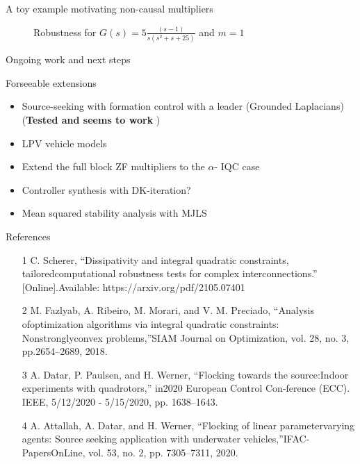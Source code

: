 \documentclass{beamer}
\begin{document}
\begin{frame}{A toy example motivating non-causal multipliers}
	
	\begin{figure}[t]
		
		\caption{Robustness for $G(s)=5\frac{(s-1)}{s(s^2+s+25)}$ and $m=1$}
		\centering
		\label{fig:benefit_of_non_causal_multipliers}
	\end{figure}	
\end{frame}
\begin{frame}{Ongoing work and next steps }
	\begin{block}{Forseeable extensions}
	\begin{itemize}
		\item Source-seeking with formation control with a leader (Grounded Laplacians) (\textbf{Tested and seems to work} )
		\item LPV vehicle models
		\item Extend the full block ZF multipliers to the $\alpha$- IQC case
		\item Controller synthesis with DK-iteration?
		\item Mean squared stability analysis with MJLS
	\end{itemize}
\end{block}
\end{frame}
\begin{frame}{References}
	\begin{itemize}
		\item[1] C.  Scherer,  “Dissipativity  and  integral  quadratic  constraints,  tailoredcomputational robustness tests for complex interconnections.” [Online].Available: https://arxiv.org/pdf/2105.07401
		\item[2]  M.  Fazlyab,  A.  Ribeiro,  M. Morari,  and  V.  M.  Preciado,  “Analysis  ofoptimization algorithms via integral quadratic constraints: Nonstronglyconvex  problems,”SIAM  Journal  on  Optimization,  vol.  28,  no.  3,  pp.2654–2689, 2018.
		\item[3]  A.  Datar,  P.  Paulsen,  and  H.  Werner,  “Flocking  towards  the  source:Indoor experiments with quadrotors,” in2020 European Control Con-ference (ECC).    IEEE, 5/12/2020 - 5/15/2020, pp. 1638–1643.
		\item[4]  A.  Attallah,  A.  Datar,  and  H.  Werner,  “Flocking  of  linear  parametervarying  agents:  Source  seeking  application  with  underwater  vehicles,”IFAC-PapersOnLine, vol. 53, no. 2, pp. 7305–7311, 2020.		
	\end{itemize}
\end{frame}
\end{document}
